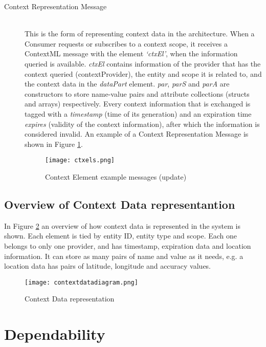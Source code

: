 \begin{description}
\item[Context Representation Message]\hfill \\
This is the form of representing context data in the architecture. When a Consumer requests or subscribes to a context scope, it receives a ContextML message with the element \textit{‘ctxEl’}, when the information queried is available. \textit{ctxEl} contains information of the provider that has the context queried (contextProvider), the entity and scope it is related to, and the context data in the \textit{dataPart} element. \textit{par}, \textit{parS} and \textit{parA} are constructors to store name-value pairs and attribute collections (structs and arrays) respectively. Every context information that is exchanged is tagged with a \textit{timestamp} (time of its generation) and an expiration time \textit{expires} (validity of the context information), after which the information is considered invalid. An example of a Context Representation Message is shown in Figure \ref{fig:ctxels}.

\begin{figure}
	\centering
	\texttt{[image: ctxels.png]}
	\caption{Context Element example messages (update)}
	\label{fig:ctxels}
	
\end{figure}


\end{description}

\subsection{Overview of Context Data representantion}

In Figure \ref{fig:contextdatadiagram} an overview of how context data is represented in the system is shown. Each element is tied by entity ID, entity type and scope. Each one belongs to only one provider, and has timestamp, expiration data and location information. It can store as many pairs of name and value as it needs, e.g. a location data has pairs of latitude, longitude and accuracy values.

\begin{figure}[h]
	\centering
	\texttt{[image: contextdatadiagram.png]}
	\caption{Context Data representation}
	\label{fig:contextdatadiagram}
	
	\end{figure}



\section{Dependability}
\label{sec:fault_tolerance}

